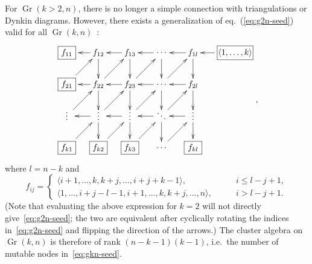 \documentclass[12pt]{article}
\DeclareMathOperator{\Gr}{Gr}
\def\ket#1{\langle #1 \rangle}
\begin{document}
For $\Gr(k>2,n)$, there is no longer a simple connection with triangulations or Dynkin diagrams. However, there exists a generalization of eq.~(\ref{eq:g2n-seed}) valid for all $\Gr(k,n)$~\cite{1088.22009}:
\begin{equation}\label{eq:gkn-seed}
\begin{gathered}
\begin{xy} 0;<-.5pt,0pt>:<0pt,-.5pt>::
	(-100,0) *+{\framebox[10ex]{$\ket{1,\ldots,k}$}} ="-1",
	(0,0) *+{f_{1l}} ="0",
	(75,0) *+{\color{white} f_{00}} ="1",
	(150,0) *+{f_{13}} ="2",
	(225,0) *+{f_{12}} ="3",
	(300,0) *+{\framebox[5ex]{$f_{11}$}} ="4",
	(0,75) *+{f_{2l}} ="5",
	(75,75) *+{\color{white} f_{00}} ="6",
	(150,75) *+{f_{23}} ="7",
	(225,75) *+{f_{22}} ="8",
	(300,75) *+{\framebox[5ex]{$f_{21}$}} ="9",
	(0,150) *+{\color{white} f_{00}} ="10",
	(75,150) *+{\color{white} f_{00}} ="11",
	(150,150) *+{\color{white} f_{00}} ="12",
	(225,150) *+{\color{white} f_{00}} ="13",
	(300,150) *+{\color{white} f_{00}} ="14",
	(0,225) *+{\framebox[5ex]{$f_{kl}$}} ="15",
	(75,225) *+{\color{white} f_{00}} ="16",
	(150,225) *+{\framebox[5ex]{$f_{k3}$}} ="17",
	(225,225) *+{\framebox[5ex]{$f_{k2}$}} ="18",
	(300,225) *+{\framebox[5ex]{$f_{k1}$}} ="19",
	(75,0) *+{\cdots} ="01",
	(75,75) *+{\cdots} ="06",
	(0,144) *+{\vdots} ="010",
	(75,144) *+{\ddots} ="011",
	(150,144) *+{\vdots} ="012",
	(225,144) *+{\vdots} ="013",
	(300,144) *+{\vdots} ="014",
	(75,225) *+{\cdots} ="016",
	"-1", {\ar"0"},
	"0", {\ar"1"},
	"0", {\ar"5"},
	"6", {\ar"0"},
	"1", {\ar"2"},
	"2", {\ar"3"},
	"2", {\ar"7"},
	"8", {\ar"2"},
	"3", {\ar"4"},
	"3", {\ar"8"},
	"9", {\ar"3"},
	"5", {\ar"6"},
	"6", {\ar"7"},
	"7", {\ar"8"},
	"8", {\ar"9"},
	"13", {\ar"7"},
	"7", {\ar"12"},
	"8", {\ar"13"},
	"5", {\ar"10"},
	"14", {\ar"8"},
	"10", {\ar"15"},
	"12", {\ar"17"},
	"19", {\ar"13"},
	"18", {\ar"12"},
	"13", {\ar"18"},
	"17", {\ar"11"},
	"16", {\ar"10"},
	"13", {\ar"14"},
	"12", {\ar"13"},
	"11", {\ar"12"},
	"10", {\ar"11"},
	"7", {\ar"1"},
	"11", {\ar"5"},
	"12", {\ar"6"},
	"1", {\ar"6"},
	"6", {\ar"11"},
	"11", {\ar"16"},
\end{xy}
\end{gathered} ,
\end{equation}
where $l=n-k$ and 
\begin{equation}
  f_{i j} =
  \begin{cases}
    \langle i+1, \dotsc, k, k+j, \dotsc, i+j+k-1\rangle, \qquad &i \leq l-j+1,\\
    \langle 1, \dotsc, i+j-l-1, i+1, \dotsc, k, k+j, \dotsc, n\rangle, \qquad &i >l-j+1.
  \end{cases}
\end{equation}
(Note that evaluating the above expression for $k=2$ will not directly give~\eqref{eq:g2n-seed}; the two are equivalent after cyclically rotating the indices in~\eqref{eq:g2n-seed} and flipping the direction of the arrows.) The cluster algebra on $\Gr(k,n)$ is therefore of rank $(n-k-1)(k-1)$, i.e.~the number of mutable nodes in~\eqref{eq:gkn-seed}. 
\end{document}
